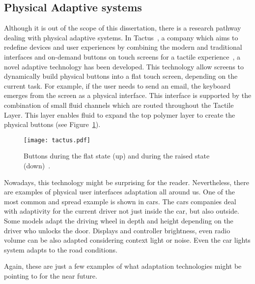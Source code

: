 \subsection{Physical Adaptive systems}
\label{sec:pyshical_adaptive_sistems}

Although it is out of the scope of this dissertation, there is a research
pathway dealing with physical adaptive systems. In Tactus~\citep{tactus}, a
company which aims to redefine devices and user experiences by combining the 
modern and traditional interfaces and on-demand buttons on touch
screens for a tactile experience~\citep{tactus_linkedin}, a novel adaptive
technology has been developed. This technology allow screens to dynamically build
physical buttons into a flat touch screen, depending on the current task. For example,
if the user needs to send an email, the keyboard emerges from the screen
as a physical interface. This interface is supported by the combination of
small fluid channels which are routed throughout the Tactile Layer. This layer
enables fluid to expand the top polymer layer to create the physical buttons (see
Figure~\ref{fig:tactus}).

\begin{figure}[H]
\centering
\texttt{[image: tactus.pdf]}
\caption{Buttons during the flat state (up) and during the raised state (down)~\citep{tactus}.}
\label{fig:tactus}
\end{figure}

Nowadays, this technology might be surprising for the reader. Nevertheless, there
are examples of physical user interfaces adaptation all around us. One of the most
common and spread example is shown in cars. The cars companies deal with adaptivity
for the current driver not just inside the car, but also outside. Some models
adapt the driving wheel in depth and height depending on the driver who unlocks
the door. Displays and controller brightness, even radio volume can be also
adapted considering context light or noise. Even the car lights system adapts
to the road conditions.

Again, these are just a few examples of what adaptation technologies might
be pointing to for the near future.



